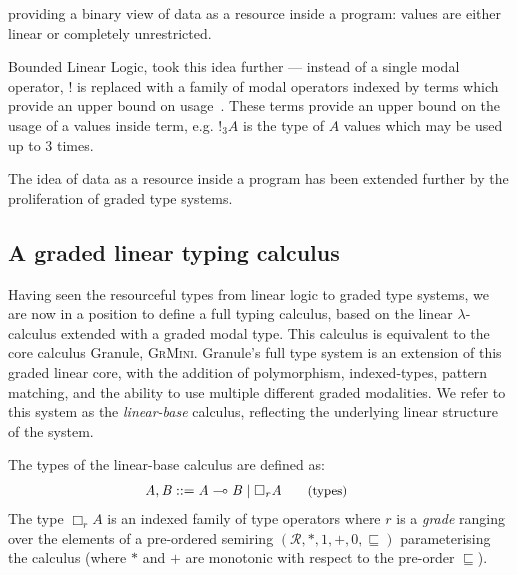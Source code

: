 providing a binary view of data as a
resource inside a program: values are either linear or completely unrestricted.

Bounded Linear Logic, took this idea further --- instead of a single modal
operator, $!$ is replaced with a family of modal operators indexed by terms
which provide an upper bound on usage~\cite{}. These terms provide an upper bound on
the usage of a values inside term, e.g. $!_{3}A$ is the type of $A$ values which
may be used up to 3 times.


The idea of data as a resource inside a program has been extended further by the
proliferation of graded type systems.


\subsection{A graded linear typing calculus}
\label{sec:linear-base}

Having seen the resourceful types from linear logic to graded type systems, we
are now in a position to define a full typing calculus, based on the linear
$\lambda$-calculus extended with a graded modal type. This calculus is
equivalent to the core calculus Granule,
\textsc{GrMini}\cite{}. Granule's full type system is an extension of this
graded linear core, with the addition of polymorphism, indexed-types, pattern
matching, and the ability to use multiple different graded modalities. We refer
to this system as the \textit{linear-base} calculus, reflecting the underlying
linear structure of the system.

The types of the linear-base calculus are defined as:
\begin{align*}
\hspace{-0.9em}\mathit{A} , \mathit{B} & ::=
       \mathit{A} \multimap \mathit{B}
  \mid \Box_{  \mathit{r}  }  \mathit{A}
{\small{\tag{types}}}
\end{align*}
The type $\Box_{r} A$ is an indexed family of type operators where $r$ is a
\textit{grade} ranging over the elements of a pre-ordered semiring
$({\mathcal{R}}, {*}, {1}, {+}, {0},
{\sqsubseteq})$ parameterising the calculus (where $\ast$ and $+$
are monotonic with respect to the pre-order $\sqsubseteq$).

